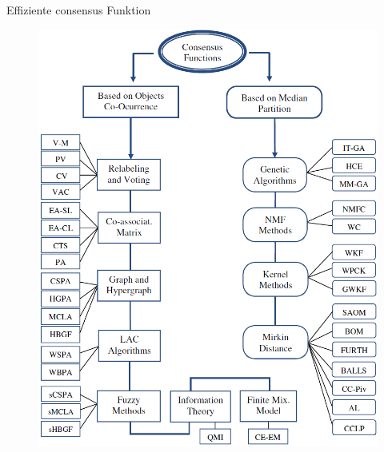 \documentclass{beamer}
\begin{document}
\begin{frame}{Effiziente consensus Funktion}
	
	\begin{figure}[h]
		\includegraphics[width=0.7\linewidth, height=0.7\textheight]{pic3}
	\end{figure}
	
\end{frame}
\end{document}
